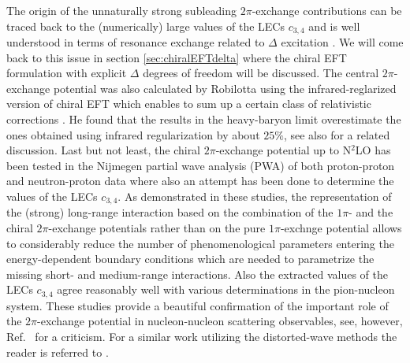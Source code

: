\documentclass[aps,rmp,nofootinbib,twocolumn,floatfix]{revtex4}
\begin{document}
The origin of the unnaturally strong subleading $2\pi$-exchange contributions
can be traced back to the (numerically) large values of the LECs $c_{3,4}$ and
is well understood in terms of resonance exchange related to $\Delta$ excitation
\cite{Bernard:1996gq}.  We will come back to this issue in section \ref{sec:chiralEFTdelta}
where the chiral EFT formulation with explicit $\Delta$ degrees of freedom will
be discussed.  The central $2\pi$-exchange potential was also
calculated by Robilotta \cite{Robilotta:2000py} using the infrared-reglarized version of
chiral EFT which enables to sum up a certain class of relativistic
corrections \cite{Becher:1999he}. He found that the results in the  heavy-baryon
limit overestimate the ones obtained using infrared regularization by
about $25 \%$, see also \cite{Epelbaum:2005pn} for a related discussion. 
Last but not least, the chiral $2\pi$-exchange potential up to N$^2$LO has been
tested in the Nijmegen partial wave analysis (PWA) of both proton-proton and
neutron-proton data \cite{Rentmeester:1999vw,Rentmeester:2003mf} where also an
attempt has been done to determine the values of the LECs $c_{3,4}$. As
demonstrated in these studies, the representation of the (strong) long-range
interaction based on the combination of the $1\pi$- and the chiral
$2\pi$-exchange potentials rather than on the pure $1\pi$-exchnge potential
allows to considerably reduce the number of 
phenomenological parameters entering the energy-dependent boundary conditions
which are needed to parametrize the missing short- and medium-range
interactions. Also the extracted values of the LECs $c_{3,4}$ agree reasonably
well with various determinations in the pion-nucleon system. These studies
provide a beautiful confirmation of the important role of the
$2\pi$-exchange potential in nucleon-nucleon scattering observables, see,
however, Ref.~\cite{Entem:2003cs} for a criticism. For a similar work
utilizing the distorted-wave methods the reader is referred to
\cite{Birse:2003nz,Birse:2007sx}.  
\end{document}

